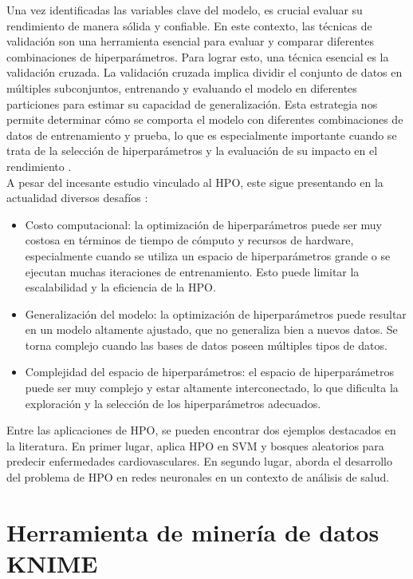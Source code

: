 Una vez identificadas las variables clave del modelo, es crucial evaluar su rendimiento de manera sólida y confiable. En este contexto, las técnicas de validación son una herramienta esencial para evaluar y comparar diferentes combinaciones de hiperparámetros. Para lograr esto, una técnica esencial es la validación cruzada. La validación cruzada implica dividir el conjunto de datos en múltiples subconjuntos, entrenando y evaluando el modelo en diferentes particiones para estimar su capacidad de generalización. Esta estrategia nos permite determinar cómo se comporta el modelo con diferentes combinaciones de datos de entrenamiento y prueba, lo que es especialmente importante cuando se trata de la selección de hiperparámetros y la evaluación de su impacto en el rendimiento \citep{hastie2009elements}. \\
A pesar del incesante estudio vinculado al HPO, este sigue presentando en la actualidad diversos desafíos \citep{hutter2019automated}:
\begin{itemize}
	\item Costo computacional: la optimización de hiperparámetros puede ser muy costosa en términos de tiempo de cómputo y recursos de hardware, especialmente cuando se utiliza un espacio de hiperparámetros grande o se ejecutan muchas iteraciones de entrenamiento. Esto puede limitar la escalabilidad y la eficiencia de la HPO.
	\item Generalización del modelo: la optimización de hiperparámetros puede resultar en un modelo altamente ajustado, que no generaliza bien a nuevos datos. Se torna complejo cuando las bases de datos poseen múltiples tipos de datos.
	\item Complejidad del espacio de hiperparámetros: el espacio de hiperparámetros puede ser muy complejo y estar altamente interconectado, lo que dificulta la exploración y la selección de los hiperparámetros adecuados.
\end{itemize}

Entre las aplicaciones de HPO, se pueden encontrar dos ejemplos destacados en la literatura. En primer lugar, \citep{hernandeztecnicas} aplica HPO en SVM y bosques aleatorios para predecir enfermedades cardiovasculares. En segundo lugar, \citep{waring2020automated} aborda el desarrollo del problema de HPO en redes neuronales en un contexto de análisis de salud.
 
\section{Herramienta de minería de datos KNIME}

